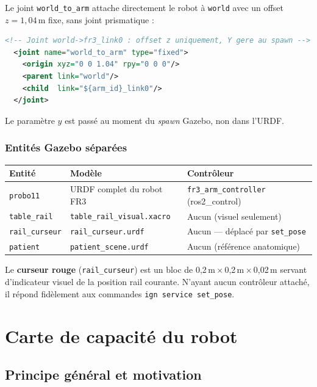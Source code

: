 \documentclass[11pt, a4paper]{article}
\newcommand{\file}[1]{\texttt{\color{AccentTeal}#1}}
\begin{document}
Le joint \texttt{world\_to\_arm} attache directement le robot à \texttt{world} avec un offset $z = 1{,}04$\,m fixe, sans joint prismatique :

\begin{lstlisting}[language=xml]
  <!-- Joint world->fr3_link0 : offset z uniquement, Y gere au spawn -->
  <joint name="world_to_arm" type="fixed">
    <origin xyz="0 0 1.04" rpy="0 0 0"/>
    <parent link="world"/>
    <child  link="${arm_id}_link0"/>
  </joint>
\end{lstlisting}

Le paramètre $y$ est passé au moment du \textit{spawn} Gazebo, non dans l'URDF.

\subsubsection{Entités Gazebo séparées}

\begin{center}
\begin{tabular}{lll}
  \toprule
  \rowcolor{LightTeal}
  \textbf{Entité} & \textbf{Modèle} & \textbf{Contrôleur} \\
  \midrule
  \texttt{probo11}      & URDF complet du robot FR3     & \texttt{fr3\_arm\_controller} (ros2\_control) \\
  \texttt{table\_rail}  & \file{table\_rail\_visual.xacro} & Aucun (visuel seulement) \\
  \texttt{rail\_curseur}& \file{rail\_curseur.urdf}        & Aucun — déplacé par \texttt{set\_pose} \\
  \texttt{patient}      & \file{patient\_scene.urdf}       & Aucun (référence anatomique) \\
  \bottomrule
\end{tabular}
\end{center}

Le \textbf{curseur rouge} (\texttt{rail\_curseur}) est un bloc de 0,2\,m\,$\times$\,0,2\,m\,$\times$\,0,02\,m servant d'indicateur visuel de la position rail courante. N'ayant aucun contrôleur attaché, il répond fidèlement aux commandes \texttt{ign service set\_pose}.

\section{Carte de capacité du robot}

\subsection{Principe général et motivation}
\end{document}
